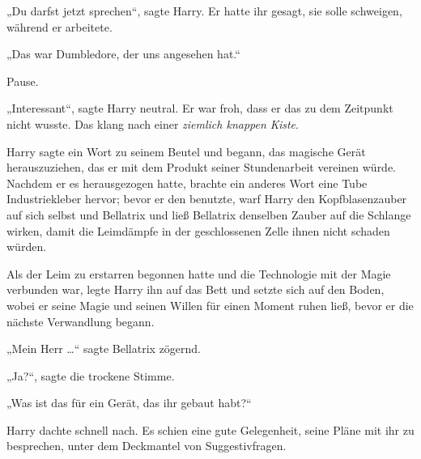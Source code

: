 „Du darfst jetzt sprechen“, sagte Harry. Er hatte ihr gesagt, sie solle schweigen, während er arbeitete.

„Das war Dumbledore, der uns angesehen hat.“

Pause.

„Interessant“, sagte Harry neutral. Er war froh, dass er das zu dem Zeitpunkt nicht wusste. Das klang nach einer \emph{ziemlich knappen Kiste}.

Harry sagte ein Wort zu seinem Beutel und begann, das magische Gerät herauszuziehen, das er mit dem Produkt seiner Stundenarbeit vereinen würde. Nachdem er es herausgezogen hatte, brachte ein anderes Wort eine Tube Industriekleber hervor; bevor er den benutzte, warf Harry den Kopfblasenzauber auf sich selbst und Bellatrix und ließ Bellatrix denselben Zauber auf die Schlange wirken, damit die Leimdämpfe in der geschlossenen Zelle ihnen nicht schaden würden.

Als der Leim zu erstarren begonnen hatte und die Technologie mit der Magie verbunden war, legte Harry ihn auf das Bett und setzte sich auf den Boden, wobei er seine Magie und seinen Willen für einen Moment ruhen ließ, bevor er die nächste Verwandlung begann.

„Mein Herr …“ sagte Bellatrix zögernd.

„Ja?“, sagte die trockene Stimme.

„Was ist das für ein Gerät, das ihr gebaut habt?“

Harry dachte schnell nach. Es schien eine gute Gelegenheit, seine Pläne mit ihr zu besprechen, unter dem Deckmantel von Suggestivfragen.

